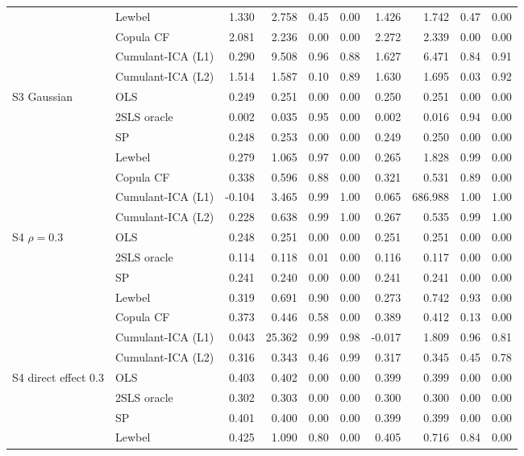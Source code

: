 \begin{table}[p]
\begin{tabular}{@{}llrrrrrrrr@{}}
 & Lewbel & 1.330 & 2.758 & 0.45 & 0.00 & 1.426 & 1.742 & 0.47 & 0.00 \\
 & Copula CF & 2.081 & 2.236 & 0.00 & 0.00 & 2.272 & 2.339 & 0.00 & 0.00 \\
 & Cumulant-ICA (L1) & 0.290 & 9.508 & 0.96 & 0.88 & 1.627 & 6.471 & 0.84 & 0.91 \\
 & Cumulant-ICA (L2) & 1.514 & 1.587 & 0.10 & 0.89 & 1.630 & 1.695 & 0.03 & 0.92 \\
\addlinespace
S3 Gaussian & OLS & 0.249 & 0.251 & 0.00 & 0.00 & 0.250 & 0.251 & 0.00 & 0.00 \\
 & 2SLS oracle & 0.002 & 0.035 & 0.95 & 0.00 & 0.002 & 0.016 & 0.94 & 0.00 \\
 & SP & 0.248 & 0.253 & 0.00 & 0.00 & 0.249 & 0.250 & 0.00 & 0.00 \\
 & Lewbel & 0.279 & 1.065 & 0.97 & 0.00 & 0.265 & 1.828 & 0.99 & 0.00 \\
 & Copula CF & 0.338 & 0.596 & 0.88 & 0.00 & 0.321 & 0.531 & 0.89 & 0.00 \\
 & Cumulant-ICA (L1) & -0.104 & 3.465 & 0.99 & 1.00 & 0.065 & 686.988 & 1.00 & 1.00 \\
 & Cumulant-ICA (L2) & 0.228 & 0.638 & 0.99 & 1.00 & 0.267 & 0.535 & 0.99 & 1.00 \\
\addlinespace
S4 $\rho=0.3$ & OLS & 0.248 & 0.251 & 0.00 & 0.00 & 0.251 & 0.251 & 0.00 & 0.00 \\
 & 2SLS oracle & 0.114 & 0.118 & 0.01 & 0.00 & 0.116 & 0.117 & 0.00 & 0.00 \\
 & SP & 0.241 & 0.240 & 0.00 & 0.00 & 0.241 & 0.241 & 0.00 & 0.00 \\
 & Lewbel & 0.319 & 0.691 & 0.90 & 0.00 & 0.273 & 0.742 & 0.93 & 0.00 \\
 & Copula CF & 0.373 & 0.446 & 0.58 & 0.00 & 0.389 & 0.412 & 0.13 & 0.00 \\
 & Cumulant-ICA (L1) & 0.043 & 25.362 & 0.99 & 0.98 & -0.017 & 1.809 & 0.96 & 0.81 \\
 & Cumulant-ICA (L2) & 0.316 & 0.343 & 0.46 & 0.99 & 0.317 & 0.345 & 0.45 & 0.78 \\
\addlinespace
S4 direct effect $0.3$ & OLS & 0.403 & 0.402 & 0.00 & 0.00 & 0.399 & 0.399 & 0.00 & 0.00 \\
 & 2SLS oracle & 0.302 & 0.303 & 0.00 & 0.00 & 0.300 & 0.300 & 0.00 & 0.00 \\
 & SP & 0.401 & 0.400 & 0.00 & 0.00 & 0.399 & 0.399 & 0.00 & 0.00 \\
 & Lewbel & 0.425 & 1.090 & 0.80 & 0.00 & 0.405 & 0.716 & 0.84 & 0.00 \\

\end{tabular}
\end{table}
